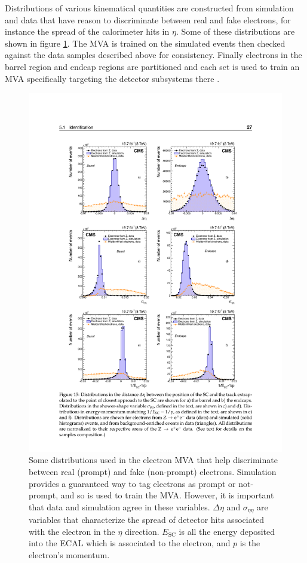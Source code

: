     Distributions of various kinematical quantities are constructed from simulation and data that have reason to discriminate between real and fake electrons, for instance the spread of the calorimeter hits in $\eta$. Some of these distributions are shown in figure \ref{fig:electron_mva_discriminating_vars}. The MVA is trained on the simulated events then checked against the data samples described above for consistency. Finally electrons in the barrel region and endcap regions are partitioned and each set is used to train an MVA specifically targeting the detector subsystems there \cite{cms_electron_photon_performance}. 

    \begin{figure}[!h]
      \centering
      \includegraphics[width=.8\textwidth]{figures/electron_mva_discriminating_distributions.pdf}
      \caption{Some distributions used in the electron MVA that help discriminate between real (prompt) and fake (non-prompt) electrons. Simulation provides a guaranteed way to tag electrons as prompt or not-prompt, and so is used to train the MVA. However, it is important that data and simulation agree in these variables. $\Delta \eta$ and $\sigma_{\eta\eta}$ are variables that characterize the spread of detector hits associated with the electron in the $\eta$ direction. $E_\text{SC}$ is all the energy deposited into the ECAL which is associated to the electron, and $p$ is the electron's momentum. }
      \label{fig:electron_mva_discriminating_vars}
    \end{figure}


